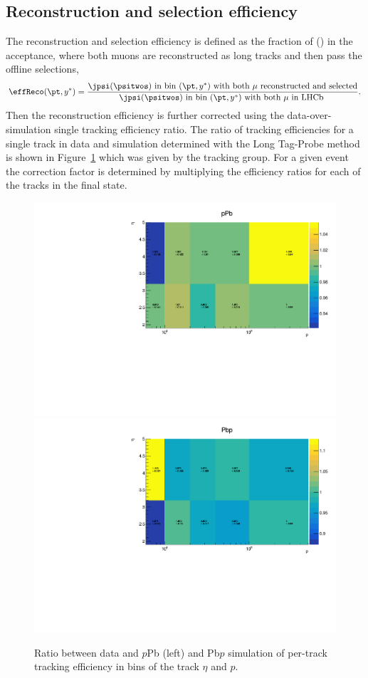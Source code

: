  \subsection{Reconstruction and selection efficiency}
 The reconstruction and selection efficiency is defined as the fraction of \jpsi (\psitwos) in the acceptance, where both muons are reconstructed as long tracks and then pass the offline selections,
 \begin{equation}
    \effReco(\pt,y^*)=\frac{\jpsi(\psitwos) \mathrm{ \ in \  bin \ } (\pt,y^*) \mathrm{ \ with  \ both \ } \mu \mathrm{ \ reconstructed \ and \ selected}}{\jpsi(\psitwos) \mathrm{ \ in \  bin \ } (\pt,y^*) \mathrm{ \ with  \ both \ } \mu \mathrm{ \ in \  LHCb \ }}.
\end{equation}
%
Then the reconstruction efficiency is further corrected using the data-over-simulation single tracking efficiency ratio. The ratio of tracking efficiencies for a single track in data and simulation determined with the Long Tag-Probe method is shown in Figure~\ref{TrackTable} which was given by the tracking group. For a given event the correction factor is determined by multiplying the efficiency ratios for each of the tracks in the final state.
\begin{figure}[!tbp]
\begin{center}
\includegraphics[width=0.49\linewidth]{pdf/pPb/Workdir/TrackCalib/pPb.pdf}
\includegraphics[width=0.49\linewidth]{pdf/pPb/Workdir/TrackCalib/Pbp.pdf}
\end{center}
	\caption{Ratio between data and $p$Pb (left) and Pb$p$ simulation of per-track tracking efficiency in bins of the track $\eta$ and $p$.
    }
\label{TrackTable}
\end{figure}

